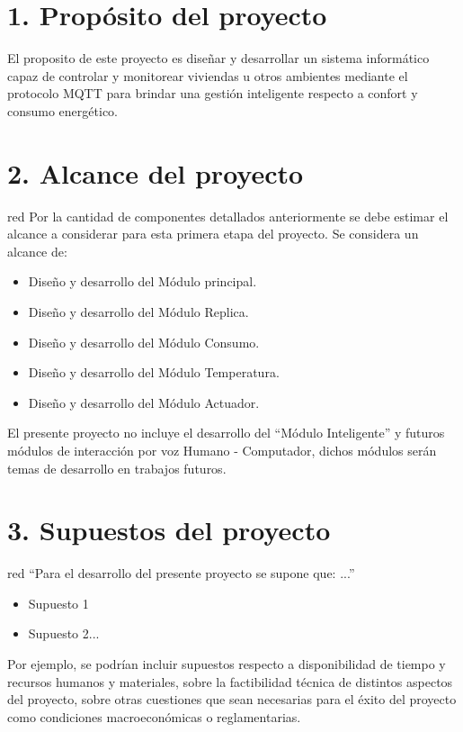 \documentclass[11pt]{charter}
\begin{document}
\section{1. Propósito del proyecto}
\label{sec:proposito}

El proposito de este proyecto es diseñar y desarrollar un sistema informático capaz de controlar y monitorear viviendas u otros ambientes mediante el protocolo MQTT para brindar una gestión inteligente respecto a confort y consumo energético.


\section{2. Alcance del proyecto}
\label{sec:alcance}
\begin{consigna}{red}
Por la cantidad de componentes detallados anteriormente se debe estimar el alcance a considerar para esta primera etapa del proyecto. Se considera un alcance de: 
\begin{itemize}
\item Diseño y desarrollo del Módulo principal.
\item Diseño y desarrollo del Módulo Replica.
\item Diseño y desarrollo del Módulo Consumo.
\item Diseño y desarrollo del Módulo Temperatura.
\item Diseño y desarrollo del Módulo Actuador.
\end{itemize}

El presente proyecto no incluye el desarrollo del ``Módulo Inteligente'' y futuros módulos de interacción por voz Humano - Computador, dichos módulos serán temas de desarrollo en trabajos futuros.

\end{consigna}

\section{3. Supuestos del proyecto}
\label{sec:supuestos}

\begin{consigna}{red}
``Para el desarrollo del presente proyecto se supone que: ...''

\begin{itemize}
\item Supuesto 1
\item Supuesto 2...
\end{itemize}

Por ejemplo, se podrían incluir supuestos respecto a disponibilidad de tiempo y recursos humanos y materiales, sobre la factibilidad técnica de distintos aspectos del proyecto, sobre otras cuestiones que sean necesarias para el éxito del proyecto como condiciones macroeconómicas o reglamentarias.
\end{consigna}
\end{document}
